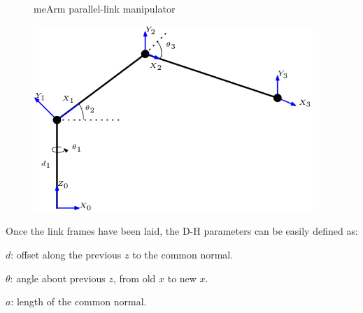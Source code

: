 \documentclass[
  letterpaper,
  DIV=11,
  numbers=noendperiod]{scrreprt}
\begin{document}
\begin{figure}

\begin{minipage}[t]{0.50\linewidth}

{\centering 


\caption{meArm parallel-link manipulator}

}

\end{minipage}%

\caption{\label{fig-dh}\includegraphics[width=4.16667in,height=\textheight]{./images/meArm.png}}

\end{figure}

Once the link frames have been laid, the D-H parameters can be easily
defined as:

\(d\): offset along the previous \(z\) to the common normal.

\(\theta\): angle about previous \(z\), from old \(x\) to new \(x\).

\(a\): length of the common normal.
\end{document}
